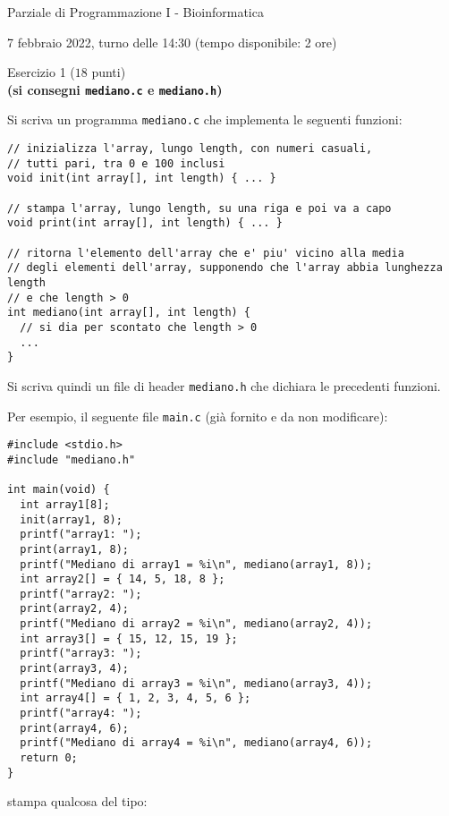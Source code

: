 \documentclass[12pt]{article}
\begin{document}
\begin{center}{\LARGE Parziale di Programmazione I - Bioinformatica}\\
\begin{center}
  \large 7 febbraio 2022, turno delle 14:30 (tempo disponibile: 2 ore)
\end{center}
\end{center}

\vspace*{1ex}
\begin{center}{\Large Esercizio 1} ($18$ punti)\\
  \textbf{(si consegni \texttt{mediano.c} e \texttt{mediano.h})}
\end{center}

Si scriva un programma \texttt{mediano.c} che implementa le seguenti funzioni:

\begin{center}
\begin{lstlisting}[language=myC]
// inizializza l'array, lungo length, con numeri casuali,
// tutti pari, tra 0 e 100 inclusi
void init(int array[], int length) { ... }

// stampa l'array, lungo length, su una riga e poi va a capo
void print(int array[], int length) { ... }

// ritorna l'elemento dell'array che e' piu' vicino alla media
// degli elementi dell'array, supponendo che l'array abbia lunghezza length
// e che length > 0
int mediano(int array[], int length) {
  // si dia per scontato che length > 0
  ...
}
\end{lstlisting}
\end{center}
%
Si scriva quindi un file di header \texttt{mediano.h} che dichiara le precedenti funzioni.

Per esempio, il seguente file \texttt{main.c}
(gi\`a fornito e da non modificare):

\begin{center}
  \begin{lstlisting}[language=myC]
#include <stdio.h>
#include "mediano.h"

int main(void) {
  int array1[8];
  init(array1, 8);
  printf("array1: ");
  print(array1, 8);
  printf("Mediano di array1 = %i\n", mediano(array1, 8));
  int array2[] = { 14, 5, 18, 8 };
  printf("array2: ");
  print(array2, 4);
  printf("Mediano di array2 = %i\n", mediano(array2, 4));
  int array3[] = { 15, 12, 15, 19 };
  printf("array3: ");
  print(array3, 4);
  printf("Mediano di array3 = %i\n", mediano(array3, 4));
  int array4[] = { 1, 2, 3, 4, 5, 6 };
  printf("array4: ");
  print(array4, 6);
  printf("Mediano di array4 = %i\n", mediano(array4, 6));
  return 0;
}
  \end{lstlisting}
\end{center}
stampa qualcosa del tipo:
\end{document}
